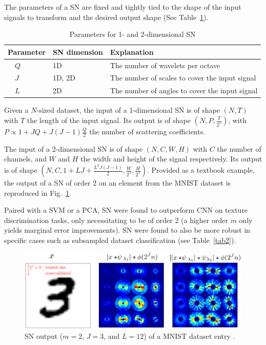 \documentclass[runningheads]{llncs}
\begin{document}
The parameters of a SN are fixed and tightly tied to the shape of the input signals to transform and the desired output shape\cite{andreux}\cite{mallatgroup}\cite{mallatIEEE}\cite{mallatlecture} (See Table~\ref{tab1}). 
\begin{table}\centering
\caption{Parameters for 1- and 2-dimensional SN}\label{tab1}
\begin{tabular}{| p{2cm} | p{2.5cm} | p{7cm} |}
\hline
Parameter & SN dimension & Explanation \\
\hline
$\quad Q$ & 1D & The number of wavelets per octave \\
$\quad J$ & 1D, 2D & The number of scales to cover the input signal \\
$\quad L$ & 2D & The number of angles to cover the input signal \\
\hline
\end{tabular}
\end{table}

Given a $N$-sized dataset, the input of a 1-dimensional SN is of shape $(N, T)$ with $T$ the length of the input signal. Its output is of shape $(N, P, \frac{T}{2^J})$, with $P \propto 1+JQ + J(J-1)\frac{Q}{2}$ the number of scattering coefficients. 

The input of a 2-dimensional SN is of shape $(N, C, W, H)$ with $C$ the number of channels, and $W$ and $H$ the width and height of the signal respectively. Its output is of shape $(N, C, 1+LJ + \frac{L^2J(J-1)}{2},\frac{W}{2^J},\frac{H}{2^J})$\cite{bruna2012invariant}. Provided as a textbook example, the output of a SN of order 2 on an element from the MNIST dataset is reproduced in Fig.~\ref{fig2}.

Paired with a SVM or a PCA, SN were found to outperform CNN on texture discrimination tasks, only necessitating to be of order 2\cite{mallatIEEE}\cite{mallatlecture} (a higher order $m$ only yields marginal error improvements). SN were found to also be more robust in specific cases such as subsampled dataset classification (see Table~\ref{tab2}).
\begin{figure}
\centering\includegraphics[width=\textwidth]{MNIST.png}
\caption{SN output ($m=2$, $J=3$, and $L=12$) of a MNIST dataset entry \cite{maison}\cite{mallatlecture}.} \label{fig2}
\end{figure}
\end{document}
